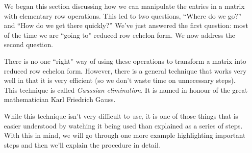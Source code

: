 \medskip

We began this section discussing how we can manipulate the entries in a matrix with elementary row operations. This led to two questions, ``Where do we go?'' and ``How do we get there quickly?'' We've just answered the first question: most of the time we are ``going to'' reduced row echelon form. We now address the second question.

There is no one ``right'' way of using these operations to transform a matrix into reduced row echelon form. However, there is a general technique that works very well in that it is very efficient (so we don't waste time on unnecessary steps). This technique is called 
\textit{Gaussian elimination}. It is named in honour of the great mathematician Karl Friedrich Gauss.

While this technique isn't very difficult to use, it is one of those things that is easier understood by watching it being used than explained as a series of steps. With this in mind, we will go through one more example highlighting important steps and then we'll explain the procedure in detail.

\pagebreak

